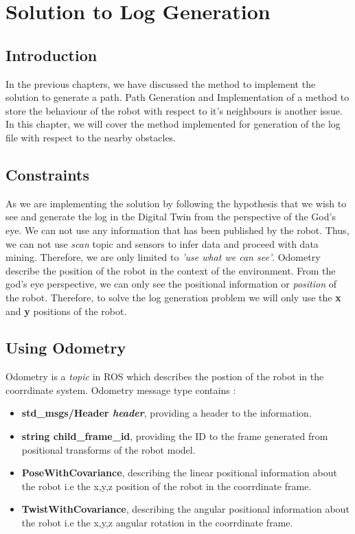 
\chapter{Solution to Log Generation} %

\label{Chapter4} %

\section{Introduction}
In the previous chapters, we have discussed the method to implement the solution to generate a path. Path Generation and Implementation of a method to store the behaviour of the robot with respect to it's neighbours is another issue.
In this chapter, we will cover the method implemented for generation of the log file with respect to the nearby obstacles. 

\section{Constraints}
As we are implementing the solution by following the hypothesis that we wish to see and generate the log in the Digital Twin from the perspective of the God's eye.
We can not use any information that has been published by the robot. Thus, we can not use \textit{scan} topic and sensors to infer data and proceed with data mining.
Therefore, we are only limited to \textit{'use what we can see'}. Odometry describe the position of the robot in the context of the environment. From the god's eye perspective,
we can only see the positional information or \textit{position} of the robot. Therefore, to solve the log generation problem we will only use the \textbf{x} and \textbf{y} positions of the robot.

\section{Using Odometry}
Odometry is a \textit{topic} in ROS which describes the postion of the robot in the coorrdinate system. Odometry message type contains :
\begin{itemize}
    \item \textbf{std\_msgs/Header \textit{header}}, providing a header to the information.
    \item \textbf{string child\_frame\_id}, providing the ID to the frame generated from positional transforms of the robot model.
    \item \textbf{PoseWithCovariance}, describing the linear positional information about the robot i.e the x,y,z position of the robot in the coorrdinate frame.
    \item \textbf{TwistWithCovariance}, describing the angular positional information about the robot i.e the x,y,z angular rotation in the coorrdinate frame.
\end{itemize}

